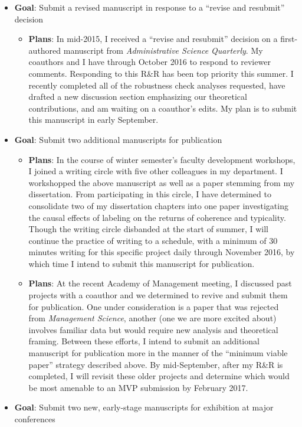 \documentclass[11pt,article,oneside]{memoir}
\begin{document}
\begin{itemize}
\tightlist
\item
  \textbf{Goal}: Submit a revised manuscript in response to a
  \enquote{revise and resubmit} decision

  \begin{itemize}
  \tightlist
  \item
    \textbf{Plans}: In mid-2015, I received a \enquote{revise and
    resubmit} decision on a first-authored manuscript from
    \emph{Administrative Science Quarterly}. My coauthors and I have
    through October 2016 to respond to reviewer comments. Responding to
    this R\&R has been top priority this summer. I recently completed
    all of the robustness check analyses requested, have drafted a new
    discussion section emphasizing our theoretical contributions, and am
    waiting on a coauthor's edits. My plan is to submit this manuscript
    in early September.
  \end{itemize}
\item
  \textbf{Goal}: Submit two additional manuscripts for publication

  \begin{itemize}
  \tightlist
  \item
    \textbf{Plans}: In the course of winter semester's faculty
    development workshops, I joined a writing circle with five other
    colleagues in my department. I workshopped the above manuscript as
    well as a paper stemming from my dissertation. From participating in
    this circle, I have determined to consolidate two of my dissertation
    chapters into one paper investigating the causal effects of labeling
    on the returns of coherence and typicality. Though the writing
    circle disbanded at the start of summer, I will continue the
    practice of writing to a schedule, with a minimum of 30 minutes
    writing for this specific project daily through November 2016, by
    which time I intend to submit this manuscript for publication.
  \item
    \textbf{Plans}: At the recent Academy of Management meeting, I
    discussed past projects with a coauthor and we determined to revive
    and submit them for publication. One under consideration is a paper
    that was rejected from \emph{Management Science}, another (one we
    are more excited about) involves familiar data but would require new
    analysis and theoretical framing. Between these efforts, I intend to
    submit an additional manuscript for publication more in the manner
    of the \enquote{minimum viable paper} strategy described above. By
    mid-September, after my R\&R is completed, I will revisit these
    older projects and determine which would be most amenable to an MVP
    submission by February 2017.
  \end{itemize}
\item
  \textbf{Goal}: Submit two new, early-stage manuscripts for exhibition
  at major conferences


\end{itemize}
\end{document}
